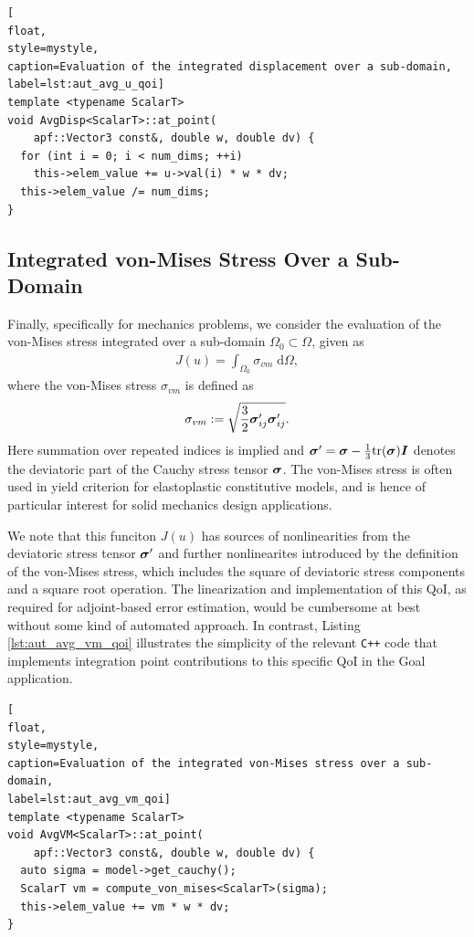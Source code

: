 \begin{lstlisting}[
float,
style=mystyle,
caption=Evaluation of the integrated displacement over a sub-domain,
label=lst:aut_avg_u_qoi]
template <typename ScalarT>
void AvgDisp<ScalarT>::at_point(
    apf::Vector3 const&, double w, double dv) {
  for (int i = 0; i < num_dims; ++i)
    this->elem_value += u->val(i) * w * dv;
  this->elem_value /= num_dims;
}
\end{lstlisting}

\subsection{Integrated von-Mises Stress Over a Sub-Domain}

Finally, specifically for mechanics problems, we consider the evaluation of
the von-Mises stress integrated over a sub-domain $\Omega_0 \subset \Omega$,
given as
%
\begin{gather}
J(u) = \int_{\Omega_0} \sigma_{vm} \; \text{d} \Omega,
\label{eq:aut_avg_vm_qoi}
\end{gather}
%
where the von-Mises stress $\sigma_{vm}$ is defined as
%
\begin{gather}
\sigma_{vm} := \sqrt{\frac32 \boldsymbol{\sigma}'_{ij} \boldsymbol{\sigma}'_{ij}}.
\label{eq:aut_vm_defn}
\end{gather}
%
Here summation over repeated indices is implied and
$\boldsymbol{\sigma}' = \boldsymbol{\sigma} - \frac13 \text{tr}(\boldsymbol{\sigma})\boldsymbol{I}$ denotes
the deviatoric part of the Cauchy stress tensor $\boldsymbol{\sigma}$. The von-Mises
stress is often used in yield criterion for elastoplastic constitutive models,
and is hence of particular interest for solid mechanics design applications.

We note that this funciton $J(u)$ has sources of nonlinearities from the
deviatoric stress tensor $\boldsymbol{\sigma}'$ and further nonlinearites introduced
by the definition of the von-Mises stress, which includes the square of
deviatoric stress components and a square root operation. The linearization
and implementation of this QoI, as required for adjoint-based error
estimation, would be cumbersome at best without some kind of automated
approach. In contrast, Listing \ref{lst:aut_avg_vm_qoi}
illustrates the simplicity of the relevant
\texttt{C++} code that implements integration point contributions to this
specific QoI in the Goal application.

\begin{lstlisting}[
float,
style=mystyle,
caption=Evaluation of the integrated von-Mises stress over a sub-domain,
label=lst:aut_avg_vm_qoi]
template <typename ScalarT>
void AvgVM<ScalarT>::at_point(
    apf::Vector3 const&, double w, double dv) {
  auto sigma = model->get_cauchy();
  ScalarT vm = compute_von_mises<ScalarT>(sigma);
  this->elem_value += vm * w * dv;
}
\end{lstlisting}

